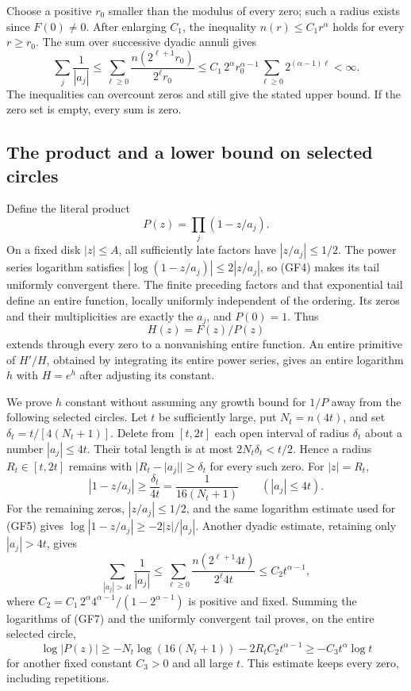 Choose a positive $r_0$ smaller than the modulus of every zero;
such a radius exists since $F(0)\ne0$. After enlarging $C_1$,
the inequality $n(r)\le C_1r^\alpha$ holds for every $r\ge r_0$.
The sum over successive dyadic annuli gives
\[
\sum_j\frac1{|a_j|}
\le\sum_{\ell\ge0}
\frac{n(2^{\ell+1}r_0)}{2^\ell r_0}
\le C_1\,2^\alpha r_0^{\alpha-1}
\sum_{\ell\ge0}2^{(\alpha-1)\ell}<\infty.
\tag{GF4}
\]
The inequalities can overcount zeros and still give the stated
upper bound. If the zero set is empty, every sum is zero.

\subsection{The product and a lower bound on selected circles}
Define the literal product
\[
P(z)=\prod_j(1-z/a_j).
\tag{GF5}
\]
On a fixed disk $|z|\le A$, all sufficiently late factors have
$|z/a_j|\le1/2$. The power series logarithm satisfies
$|\log(1-z/a_j)|\le2|z/a_j|$, so (GF4) makes its tail uniformly
convergent there. The finite preceding factors and that exponential
tail define an entire function, locally uniformly independent of
the ordering. Its zeros and their multiplicities are exactly the
$a_j$, and $P(0)=1$. Thus
\[
H(z)=F(z)/P(z)
\tag{GF6}
\]
extends through every zero to a nonvanishing entire function.
An entire primitive of $H'/H$, obtained by integrating its entire
power series, gives an entire logarithm $h$ with $H=e^h$ after
adjusting its constant.

We prove $h$ constant without assuming any growth bound for
$1/P$ away from the following selected circles. Let $t$ be
sufficiently large, put $N_t=n(4t)$, and set
$\delta_t=t/[4(N_t+1)]$. Delete from $[t,2t]$ each open interval
of radius $\delta_t$ about a number $|a_j|\le4t$.
Their total length is at most $2N_t\delta_t<t/2$.
Hence a radius $R_t\in[t,2t]$ remains with
$|R_t-|a_j||\ge\delta_t$ for every such zero. For $|z|=R_t$,
\[
|1-z/a_j|\ge\frac{\delta_t}{4t}
=\frac1{16(N_t+1)}\qquad(|a_j|\le4t).
\tag{GF7}
\]
For the remaining zeros, $|z/a_j|\le1/2$, and the same logarithm
estimate used for (GF5) gives
$\log|1-z/a_j|\ge-2|z|/|a_j|$.
Another dyadic estimate, retaining only $|a_j|>4t$, gives
\[
\sum_{|a_j|>4t}\frac1{|a_j|}
\le\sum_{\ell\ge0}
\frac{n(2^{\ell+1}4t)}{2^\ell4t}
\le C_2t^{\alpha-1},
\tag{GF8}
\]
where $C_2=C_1\,2^\alpha4^{\alpha-1}/(1-2^{\alpha-1})$
is positive and fixed. Summing the logarithms of (GF7) and the
uniformly convergent tail proves, on the entire selected circle,
\[
\log|P(z)|
\ge-N_t\log(16(N_t+1))-2R_tC_2t^{\alpha-1}
\ge-C_3t^\alpha\log t
\tag{GF9}
\]
for another fixed constant $C_3>0$ and all large $t$.
This estimate keeps every zero, including repetitions.

